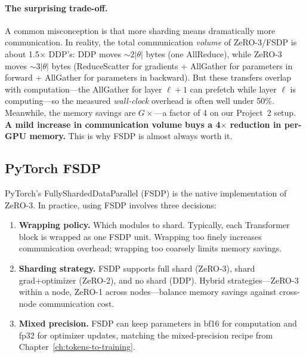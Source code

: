 \paragraph{The surprising trade-off.} A common misconception is that more sharding means dramatically more communication. In reality, the total communication \emph{volume} of ZeRO-3/FSDP is about 1.5$\times$ DDP's: DDP moves $\sim\!2|\theta|$ bytes (one AllReduce), while ZeRO-3 moves $\sim\!3|\theta|$ bytes (ReduceScatter for gradients + AllGather for parameters in forward + AllGather for parameters in backward). But these transfers overlap with computation---the AllGather for layer $\ell+1$ can prefetch while layer $\ell$ is computing---so the measured \emph{wall-clock} overhead is often well under 50\%. Meanwhile, the memory savings are $G\times$---a factor of 4 on our Project~2 setup. \textbf{A mild increase in communication volume buys a 4$\times$ reduction in per-GPU memory.} This is why FSDP is almost always worth it.

\noindent{}


\subsection{PyTorch FSDP}

PyTorch's FullyShardedDataParallel (FSDP) is the native implementation of ZeRO-3. In practice, using FSDP involves three decisions:

\begin{enumerate}[nosep]
  \item \textbf{Wrapping policy.} Which modules to shard. Typically, each Transformer block is wrapped as one FSDP unit. Wrapping too finely increases communication overhead; wrapping too coarsely limits memory savings.
  \item \textbf{Sharding strategy.} FSDP supports full shard (ZeRO-3), shard grad+optimizer (ZeRO-2), and no shard (DDP). Hybrid strategies---ZeRO-3 within a node, ZeRO-1 across nodes---balance memory savings against cross-node communication cost.
  \item \textbf{Mixed precision.} FSDP can keep parameters in bf16 for computation and fp32 for optimizer updates, matching the mixed-precision recipe from Chapter~\ref{ch:tokens-to-training}.
\end{enumerate}

